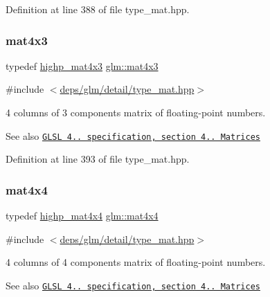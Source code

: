 Definition at line 388 of file type\+\_\+mat.\+hpp.

\mbox{\label{group__core__types_gad3f3f750dcdc74a9037342c5cae55f5e}} 
\subsubsection{\texorpdfstring{mat4x3}{mat4x3}}
{\footnotesize\ttfamily typedef \hyperlink{group__core__precision_ga20620a62fd7d4e020e772c4d258cf2e4}{highp\+\_\+mat4x3} \hyperlink{group__core__types_gad3f3f750dcdc74a9037342c5cae55f5e}{glm\+::mat4x3}}



{\ttfamily \#include $<$\hyperlink{type__mat_8hpp}{deps/glm/detail/type\+\_\+mat.\+hpp}$>$}

4 columns of 3 components matrix of floating-\/point numbers.

\begin{DoxySeeAlso}{See also}
\href{http://www.opengl.org/registry/doc/GLSLangSpec.4.20.8.pdf}{\tt G\+L\+SL 4.. specification, section 4.. Matrices} 
\end{DoxySeeAlso}


Definition at line 393 of file type\+\_\+mat.\+hpp.

\mbox{\label{group__core__types_ga63e3ee9447ed593484140a9368e738ec}} 
\subsubsection{\texorpdfstring{mat4x4}{mat4x4}}
{\footnotesize\ttfamily typedef \hyperlink{group__core__precision_ga93c7db376e7b0bd24ef4947667468c9a}{highp\+\_\+mat4x4} \hyperlink{group__core__types_ga63e3ee9447ed593484140a9368e738ec}{glm\+::mat4x4}}



{\ttfamily \#include $<$\hyperlink{type__mat_8hpp}{deps/glm/detail/type\+\_\+mat.\+hpp}$>$}

4 columns of 4 components matrix of floating-\/point numbers.

\begin{DoxySeeAlso}{See also}
\href{http://www.opengl.org/registry/doc/GLSLangSpec.4.20.8.pdf}{\tt G\+L\+SL 4.. specification, section 4.. Matrices} 
\end{DoxySeeAlso}


